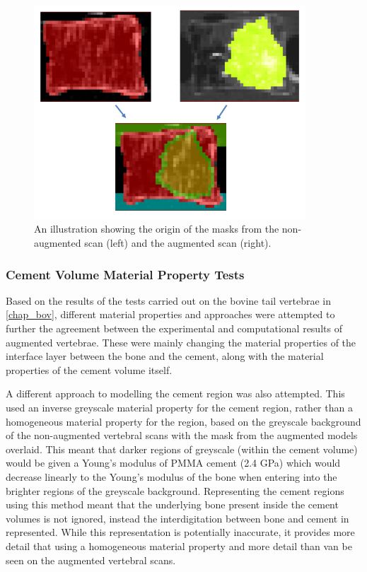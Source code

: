 \begin{figure}[ht!]
  \centering
  \includegraphics[width=4in]{Chapters/Chapter_HT_images/mask_demo.png}
  \caption{An illustration showing the origin of the masks from the non-augmented scan (left) and the augmented scan (right).}
  \label{fig:mask_demo}
\end{figure}


\subsubsection{Cement Volume Material Property Tests}

Based on the results of the tests carried out on the bovine tail vertebrae in \cref{chap_bov}, different material properties and approaches were attempted to further the agreement between the experimental and computational results of augmented vertebrae.
These were mainly changing the material properties of the interface layer between the bone and the cement, along with the material properties of the cement volume itself.

A different approach to modelling the cement region was also attempted.
This used an inverse greyscale material property for the cement region, rather than a homogeneous material property for the region, based on the greyscale background of the non-augmented vertebral scans with the mask from the augmented models overlaid.
This meant that darker regions of greyscale (within the cement volume) would be given a Young's modulus of PMMA cement (2.4 GPa) which would decrease linearly to the Young's modulus of the bone when entering into the brighter regions of the greyscale background.
Representing the cement regions using this method meant that the underlying bone present inside the cement volumes is not ignored, instead the interdigitation between bone and cement in represented.
While this representation is potentially inaccurate, it provides more detail that using a homogeneous material property and more detail than van be seen on the augmented vertebral scans.

